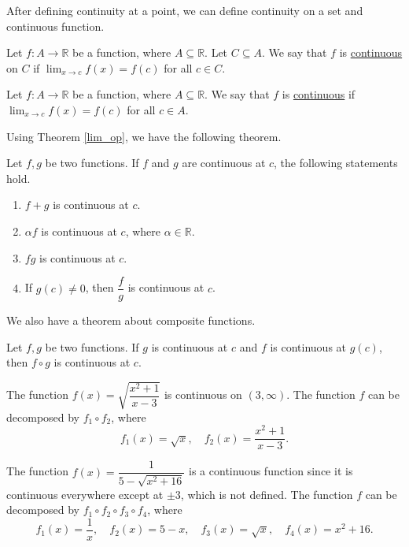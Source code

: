 \documentclass[11pt]{book}
\theoremstyle{break}
\theoremstyle{no_label}
\newcommand{\bbR}{\mathbb{R}}
\numberwithin{equation}{section}
\begin{document}
After defining continuity at a point, we can define continuity on a set and continuous function.

\begin{definition}[Continuous]
    Let $f:A\to\bbR$ be a function, where $A\subseteq\bbR$. Let $C\subseteq A$. We say that $f$ is \underline{continuous} on $C$ if $\displaystyle\lim_{x\to c}f(x)=f(c)$ for all $c\in C$.
\end{definition}

\begin{definition}[Continuous]
    Let $f:A\to\bbR$ be a function, where $A\subseteq\bbR$. We say that $f$ is \underline{continuous} if $\displaystyle\lim_{x\to c}f(x)=f(c)$ for all $c\in A$.
\end{definition}

Using Theorem \ref{lim_op}, we have the following theorem.

\begin{theorem}\label{conti_op}
    Let $f, g$ be two functions. If $f$ and $g$ are continuous at $c$, the following statements hold.
    \begin{enumerate}
        \item $f+g$ is continuous at $c$.
        \item $\alpha f$ is continuous at $c$, where $\alpha\in\bbR$.
        \item $fg$ is continuous at $c$.
        \item If $g(c)\ne0$, then $\dfrac{f}{g}$ is continuous at $c$.
    \end{enumerate}
\end{theorem}

We also have a theorem about composite functions.

\begin{theorem}
    Let $f, g$ be two functions. If $g$ is continuous at $c$ and $f$ is continuous at $g(c)$, then $f\circ g$ is continuous at $c$.
\end{theorem}

\begin{example} 
    The function $f(x)=\sqrt{\dfrac{x^2+1}{x-3}}$ is continuous on $(3, \infty)$. The function $f$ can be decomposed by $f_1\circ f_2$, where \begin{equation*}
        f_1(x)=\sqrt{x},\quad f_2(x)=\dfrac{x^2+1}{x-3}.
    \end{equation*}
\end{example}

\begin{example} 
    The function $f(x)=\dfrac{1}{5-\sqrt{x^2+16}}$ is a continuous function since it is continuous everywhere except at $\pm3$, which is not defined. The function $f$ can be decomposed by $f_1\circ f_2\circ f_3\circ f_4$, where \begin{equation*}
        f_1(x)=\dfrac{1}{x}, \quad f_2(x)=5-x, \quad f_3(x)=\sqrt{x}, \quad f_4(x)=x^2+16.
    \end{equation*}
\end{example}
\end{document}
